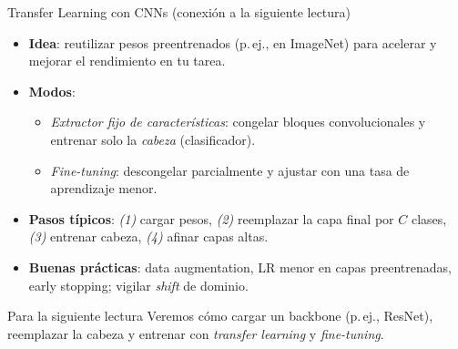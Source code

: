 \documentclass[10pt]{beamer}
\begin{document}
\begin{frame}{Transfer Learning con CNNs (conexión a la siguiente lectura)}
\begin{itemize}
  \item \textbf{Idea}: reutilizar pesos preentrenados (p.\,ej., en ImageNet) para acelerar y mejorar el rendimiento en tu tarea.
  \item \textbf{Modos}: 
    \begin{itemize}
      \item \emph{Extractor fijo de características}: congelar bloques convolucionales y entrenar solo la \emph{cabeza} (clasificador).
      \item \emph{Fine-tuning}: descongelar parcialmente y ajustar con una tasa de aprendizaje menor.
    \end{itemize}
  \item \textbf{Pasos típicos}: \textit{(1)} cargar pesos, \textit{(2)} reemplazar la capa final por $C$ clases, \textit{(3)} entrenar cabeza, \textit{(4)} afinar capas altas.
  \item \textbf{Buenas prácticas}: data augmentation, LR menor en capas preentrenadas, early stopping; vigilar \emph{shift} de dominio.
\end{itemize}
\vspace{2mm}
\centering
{}
\vspace{2mm}
\begin{block}{Para la siguiente lectura}
Veremos cómo cargar un backbone (p.\,ej., ResNet), reemplazar la cabeza y entrenar con \emph{transfer learning} y \emph{fine-tuning}.
\end{block}
\end{frame}
\end{document}
